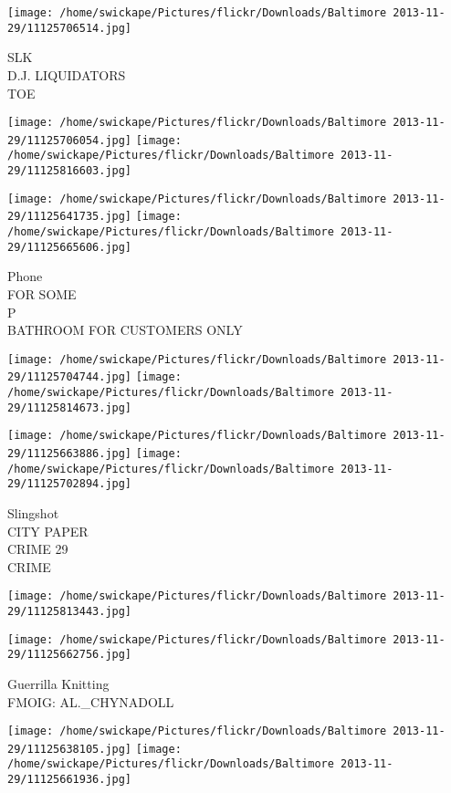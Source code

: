 \documentclass[10pt,letterpaper]{article}
\begin{document}
\vspace{0.25in}
\texttt{[image: /home/swickape/Pictures/flickr/Downloads/Baltimore 2013-11-29/11125706514.jpg]}

SLK\\
D.J. LIQUIDATORS\\
TOE\\
\pagebreak

\texttt{[image: /home/swickape/Pictures/flickr/Downloads/Baltimore 2013-11-29/11125706054.jpg]}
\texttt{[image: /home/swickape/Pictures/flickr/Downloads/Baltimore 2013-11-29/11125816603.jpg]}

\texttt{[image: /home/swickape/Pictures/flickr/Downloads/Baltimore 2013-11-29/11125641735.jpg]}
\texttt{[image: /home/swickape/Pictures/flickr/Downloads/Baltimore 2013-11-29/11125665606.jpg]}

Phone\\
FOR SOME\\
P\\
BATHROOM FOR CUSTOMERS ONLY\\
\pagebreak

\texttt{[image: /home/swickape/Pictures/flickr/Downloads/Baltimore 2013-11-29/11125704744.jpg]}
\texttt{[image: /home/swickape/Pictures/flickr/Downloads/Baltimore 2013-11-29/11125814673.jpg]}

\texttt{[image: /home/swickape/Pictures/flickr/Downloads/Baltimore 2013-11-29/11125663886.jpg]}
\texttt{[image: /home/swickape/Pictures/flickr/Downloads/Baltimore 2013-11-29/11125702894.jpg]}

Slingshot\\
CITY PAPER\\
CRIME 29\\
CRIME\\
\pagebreak

\texttt{[image: /home/swickape/Pictures/flickr/Downloads/Baltimore 2013-11-29/11125813443.jpg]}

\vspace{0.25in}
\texttt{[image: /home/swickape/Pictures/flickr/Downloads/Baltimore 2013-11-29/11125662756.jpg]}

Guerrilla Knitting\\
FMOIG: AL.\_CHYNADOLL\\
\pagebreak

\texttt{[image: /home/swickape/Pictures/flickr/Downloads/Baltimore 2013-11-29/11125638105.jpg]}
\texttt{[image: /home/swickape/Pictures/flickr/Downloads/Baltimore 2013-11-29/11125661936.jpg]}
\end{document}
